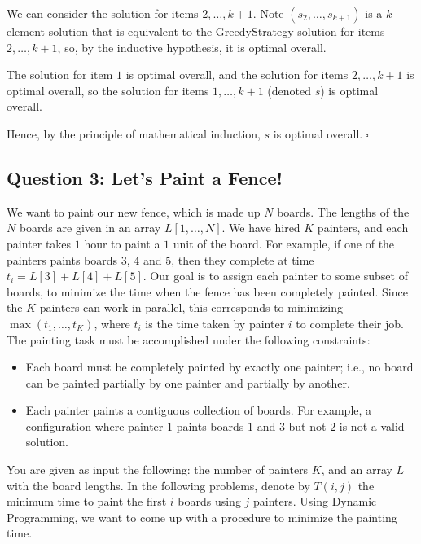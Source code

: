 \begin{enumerate}
\begin{solution}
We can consider the solution for items $2,\dots,k+1$. Note $(s_2,\dots,s_{k+1})$ is a $k$-element solution that is equivalent to the {\sc GreedyStrategy} solution for items $2,\dots,k+1$, so, by the inductive hypothesis, it is optimal overall. 

The solution for item $1$ is optimal overall, and the solution for items $2,\dots,k+1$ is optimal overall, so the solution for items $1,\dots,k+1$ (denoted $s$) is optimal overall.

Hence, by the principle of mathematical induction, $s$ is optimal overall.$~\square$
\end{solution}
\end{enumerate}
\newpage
\subsection*{Question 3: Let's Paint a Fence!}
We want to paint our new fence, which is made up $N$ boards. The
lengths of the $N$ boards are given in an array
$L[1,\ldots,N]$. We have hired $K$ painters, and
each painter takes $1$ hour to paint a $1$ unit of the board. For example,
if one of the painters paints boards $3$, $4$ and $5$, then they
complete at time $t_i=L[3]+L[4]+L[5]$. Our goal is to assign each
painter to some subset of boards, to minimize the time when the fence
has been completely painted. Since the $K$ painters can work in
parallel, this corresponds to minimizing $\max(t_1,\ldots,t_K)$, where
$t_i$ is the time taken by painter $i$ to complete their job. The
painting task must be accomplished under the following constraints:
\begin{itemize}
    \item Each board must be completely painted by exactly one painter;
      i.e., no board can be painted partially by one painter and partially
      by another.
    \item Each painter paints a contiguous collection of boards.  For example, a
      configuration where painter $1$ paints boards $1$ and $3$ but not
      $2$ is not a valid solution.
\end{itemize}
You are given as input the following: the number of painters $K$, and
an array $L$ with the board lengths.  In the following problems,
denote by $T(i,j)$ the minimum time to paint the first $i$ boards using
$j$ painters. Using Dynamic Programming, we want to come up with a procedure 
to minimize the painting time.
